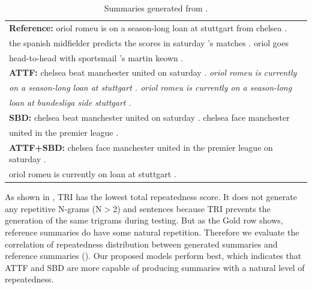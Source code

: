 \begin{table}[th!]
\begin{center}
\scriptsize
\caption{Summaries generated from .}
\begin{tabular}{|l|}%
\hline \textbf{Reference:} oriol romeu is on a season-long loan at stuttgart from chelsea . \\
       the spanish midfielder predicts the scores in saturday 's matches . oriol goes \\
	   head-to-head with sportsmail 's martin keown .\\
\hline \textbf{ATTF:} chelsea beat manchester united on saturday . \textit{oriol romeu is currently} \\
       \textit{on a season-long loan at stuttgart . oriol romeu is currently on a season-long} \\
	   \textit{loan at bundesliga side stuttgart .}\\
\hline \textbf{SBD:} chelsea beat manchester united on saturday . chelsea face manchester \\
       united in the premier league . \\ 
\hline \textbf{ATTF+SBD:} chelsea face manchester united in the premier league on saturday . \\
       oriol romeu is currently on loan at stuttgart . \\
\hline
\end{tabular}
\end{center}
\label{tab:src_rep}
\end{table}

As shown in , TRI has the lowest total repeatedness score.
It does not generate any repetitive N-grams (N$>$2) and sentences 
because TRI prevents the generation of the same trigrams during testing.
But as the Gold row shows, reference summaries do have some natural repetition.
Therefore we evaluate the correlation of repeatedness distribution between
generated summaries and reference summaries ().
Our proposed models perform best,
which indicates that ATTF and SBD are more capable of producing summaries with a natural level of repeatedness.

